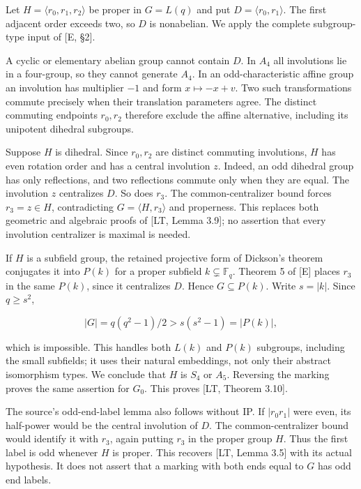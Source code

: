 \documentclass[
  11pt,
]{article}
\begin{document}
Let \(H=\langle r_0,r_1,r_2\rangle\) be proper in \(G=L(q)\) and put
\(D=\langle r_0,r_1\rangle\). The first adjacent order exceeds two, so
\(D\) is nonabelian. We apply the complete subgroup-type input of {[}E,
§2{]}.

A cyclic or elementary abelian group cannot contain \(D\). In \(A_4\)
all involutions lie in a four-group, so they cannot generate \(A_4\). In
an odd-characteristic affine group an involution has multiplier \(-1\)
and form \(x\mapsto-x+v\). Two such transformations commute precisely
when their translation parameters agree. The distinct commuting
endpoints \(r_0,r_2\) therefore exclude the affine alternative,
including its unipotent dihedral subgroups.

Suppose \(H\) is dihedral. Since \(r_0,r_2\) are distinct commuting
involutions, \(H\) has even rotation order and has a central involution
\(z\). Indeed, an odd dihedral group has only reflections, and two
reflections commute only when they are equal. The involution \(z\)
centralizes \(D\). So does \(r_3\). The common-centralizer bound forces
\(r_3=z\in H\), contradicting \(G=\langle H,r_3\rangle\) and properness.
This replaces both geometric and algebraic proofs of {[}LT, Lemma
3.9{]}; no assertion that every involution centralizer is maximal is
needed.

If \(H\) is a subfield group, the retained projective form of Dickson's
theorem conjugates it into \(P(k)\) for a proper subfield \(k\subsetneq
\mathbb F_q\). Theorem 5 of {[}E{]} places \(r_3\) in the same \(P(k)\),
since it centralizes \(D\). Hence \(G\subseteq P(k)\). Write \(s=|k|\).
Since \(q\ge s^2\),

\[ |G|=q(q^2-1)/2>s(s^2-1)=|P(k)|, \tag{2} \]

which is impossible. This handles both \(L(k)\) and \(P(k)\) subgroups,
including the small subfields; it uses their natural embeddings, not
only their abstract isomorphism types. We conclude that \(H\) is \(S_4\)
or \(A_5\). Reversing the marking proves the same assertion for \(G_0\).
This proves {[}LT, Theorem 3.10{]}.

The source's odd-end-label lemma also follows without IP. If
\(|r_0r_1|\) were even, its half-power would be the central involution
of \(D\). The common-centralizer bound would identify it with \(r_3\),
again putting \(r_3\) in the proper group \(H\). Thus the first label is
odd whenever \(H\) is proper. This recovers {[}LT, Lemma 3.5{]} with its
actual hypothesis. It does not assert that a marking with both ends
equal to \(G\) has odd end labels.
\end{document}
